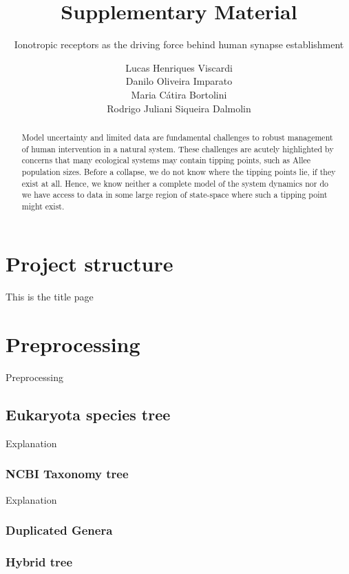 \documentclass[]{article}
\title{Supplementary Material}
\subtitle{Ionotropic receptors as the driving force behind human synapse
establishment}
\author{Lucas Henriques Viscardi \\ Danilo Oliveira Imparato \\ Maria Cátira Bortolini \\ Rodrigo Juliani Siqueira Dalmolin}
\date{}
\begin{document}
\maketitle
\begin{abstract}
Model uncertainty and limited data are fundamental challenges to robust
management of human intervention in a natural system. These challenges
are acutely highlighted by concerns that many ecological systems may
contain tipping points, such as Allee population sizes. Before a
collapse, we do not know where the tipping points lie, if they exist at
all. Hence, we know neither a complete model of the system dynamics nor
do we have access to data in some large region of state-space where such
a tipping point might exist.
\end{abstract}

{
\setcounter{tocdepth}{6}
\tableofcontents
}
\hypertarget{project-structure}{%
\section{Project structure}\label{project-structure}}

This is the title page

\hypertarget{preprocessing}{%
\section{Preprocessing}\label{preprocessing}}

Preprocessing

\hypertarget{eukaryota-species-tree}{%
\subsection{Eukaryota species tree}\label{eukaryota-species-tree}}

Explanation

\hypertarget{ncbi-taxonomy-tree}{%
\subsubsection{NCBI Taxonomy tree}\label{ncbi-taxonomy-tree}}

Explanation

\hypertarget{duplicated-genera}{%
\subsubsection{Duplicated Genera}\label{duplicated-genera}}

\hypertarget{hybrid-tree}{%
\subsubsection{Hybrid tree}\label{hybrid-tree}}
\end{document}
